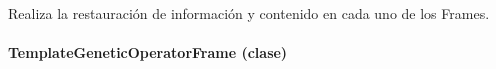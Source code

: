 \documentclass[class=report, crop=false]{standalone}
\begin{document}
\begin{fulllineitems}
\begin{fulllineitems}
\end{fulllineitems}

\begin{fulllineitems}

Realiza la restauración de información y contenido 
en cada uno de los Frames.

\end{fulllineitems}

\end{fulllineitems}

\paragraph{TemplateGeneticOperatorFrame (clase)}
\label{sec:a_3_2_5_2}
\end{document}
